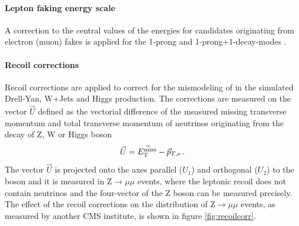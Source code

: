 \paragraph{Lepton faking \tauh energy scale} A correction to the central values of the \tauh energies for \tauh candidates originating from electron (muon) fakes is applied for the 1-prong and 1-prong+1-\pizero decay-modes \cite{Chatrchyan2011}. 

\paragraph{Recoil corrections} Recoil corrections are applied to correct for the mismodeling of \MET in the simulated Drell-Yan, W+Jets and Higgs production. The corrections are measured on the vector $\Vec{U}$ defined as the vectorial difference of the measured missing transverse momentum and total transverse momentum of neutrinos originating from the decay of Z, W or Higgs boson
\begin{equation}
    \Vec{U} = \Vec{\MET} - \Vec{p}_{T,\nu} \mend
\end{equation}
The vector $\Vec{U}$ is projected onto the axes parallel ($U_1$) and orthogonal ($U_2$) to the boson \pt and it is measured in $\mathrm{Z}\rightarrow \mu\mu$ events, where the leptonic recoil does not contain neutrinos and the four-vector of the Z boson can be measured precisely. The effect of the recoil corrections on the \MET distribution of $\mathrm{Z}\rightarrow \mu\mu$ events, as measured by another CMS institute, is shown in figure \ref{fig:recoilcorr}.

